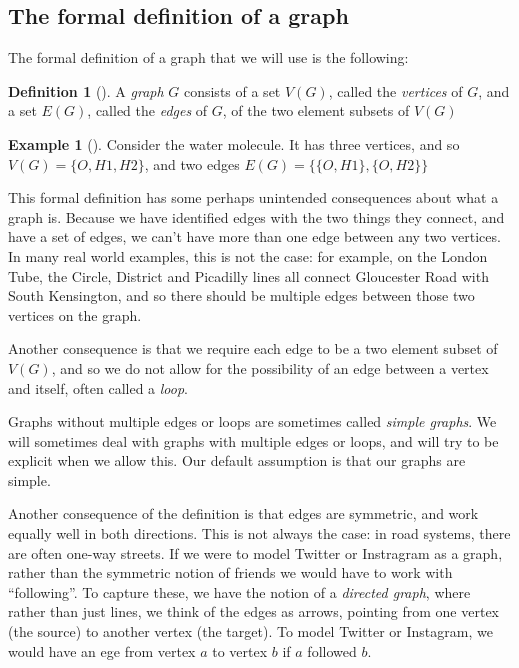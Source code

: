 \documentclass[10pt,]{book}
\theoremstyle{plain}
\theoremstyle{definition}
\newtheorem{definition}[theorem]{Definition}
\theoremstyle{definition}
\theoremstyle{definition}
\newtheorem{example}[theorem]{Example}
\theoremstyle{definition}
\numberwithin{equation}{section}
\begin{document}
\subsection[{The formal definition of a graph}]{The formal definition of a graph}\label{subsection-2}
\hypertarget{p-5}{}%
The formal definition of a graph that we will use is the following:%
\begin{definition}[{}]\label{definition-1}
\hypertarget{p-6}{}%
A \emph{graph} \(G\) consists of a set \(V(G)\), called the \emph{vertices} of \(G\), and a set \(E(G)\), called the \emph{edges} of \(G\), of the two element subsets of \(V(G)\)%
\end{definition}
\begin{example}[]\label{example-1}
\hypertarget{p-7}{}%
Consider the water molecule.  It has three vertices, and so \(V(G)=\{O, H1, H2\}\), and two edges \(E(G)=\big\{\{O, H1\},\{O,H2\}\big\}\)%
\end{example}
\hypertarget{p-8}{}%
This formal definition has some perhaps unintended consequences about what a graph is.  Because we have identified edges with the two things they connect, and have a set of edges, we can't have more than one edge between any two vertices.  In many real world examples, this is not the case: for example, on the London Tube, the Circle, District and Picadilly lines all connect Gloucester Road with South Kensington, and so there should be multiple edges between those two vertices on the graph.%
\par
\hypertarget{p-9}{}%
Another consequence is that we require each edge to be a two element subset of \(V(G)\), and so we do not allow for the possibility of an edge between a vertex and itself, often called a \emph{loop}.%
\par
\hypertarget{p-10}{}%
Graphs without multiple edges or loops are sometimes called \emph{simple graphs}.  We will sometimes deal with graphs with multiple edges or loops, and will try to be explicit when we allow this.  Our default assumption is that our graphs are simple.%
\par
\hypertarget{p-11}{}%
Another consequence of the definition is that edges are symmetric, and work equally well in both directions.  This is not always the case: in road systems, there are often one-way streets.  If we were to model Twitter or Instragram as a graph, rather than the symmetric notion of friends we would have to work with ``following''.  To capture these, we have the notion of a \emph{directed graph}, where rather than just lines, we think of the edges as arrows, pointing from one vertex (the source) to another vertex (the target).  To model Twitter or Instagram, we would have an ege from vertex \(a\) to vertex \(b\) if \(a\) followed \(b\).%
\typeout{************************************************}
\typeout{************************************************}
\end{document}
